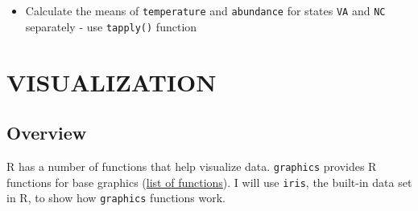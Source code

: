 \documentclass[
]{book}
\providecommand{\tightlist}{%
  \setlength{\itemsep}{0pt}\setlength{\parskip}{0pt}}
\begin{document}
\begin{itemize}
\tightlist
\item
  Calculate the means of \texttt{temperature} and \texttt{abundance} for states \texttt{VA} and \texttt{NC} separately - use \texttt{tapply()} function
\end{itemize}

\hypertarget{visualization}{%
\chapter{VISUALIZATION}\label{visualization}}

\hypertarget{overview-1}{%
\section{Overview}\label{overview-1}}

R has a number of functions that help visualize data. \texttt{graphics} provides R functions for base graphics (\href{https://www.rdocumentation.org/packages/graphics/versions/3.6.2}{list of functions}). I will use \texttt{iris}, the built-in data set in R, to show how \texttt{graphics} functions work.
\end{document}
